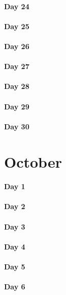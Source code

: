 \documentclass[UTF8,a4paper,8pt]{ctexart}
\begin{document}
 	 \paragraph{Day 24      \quad     }
 	 \paragraph{Day 25      \quad     }
 	 \paragraph{Day 26      \quad     }
 	 \paragraph{Day 27      \quad     }
 	 \paragraph{Day 28      \quad     }
 	 \paragraph{Day 29      \quad     }   
 	 \paragraph{Day 30      \quad     }
\section{October}
 	 \paragraph{Day 1       \quad     }
 	 \paragraph{Day 2       \quad     }
 	 \paragraph{Day 3       \quad     }
 	 \paragraph{Day 4       \quad     }
 	 \paragraph{Day 5       \quad     }
 	 \paragraph{Day 6       \quad     }
\end{document}
